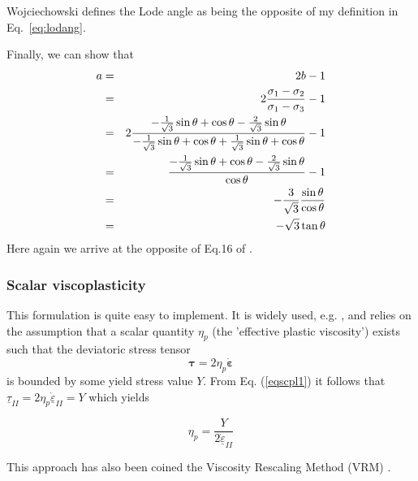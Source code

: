 \begin{remark}
Wojciechowski \cite{wojc18} defines the Lode angle  
as being the opposite of my definition in Eq.~\ref{eq:lodang}.
\end{remark}

Finally, we can show that 
\begin{eqnarray}
a 
&=& 2b-1 \nonumber\\
&=& 2 \frac{\sigma_1-\sigma_2}{\sigma_1-\sigma_3} -1 \nonumber\\
&=& 2 \frac{  -\frac{1}{\sqrt{3}}\sin \theta  + \cos \theta - \frac{2}{\sqrt{3}} \sin \theta }
{-\frac{1}{\sqrt{3}}\sin \theta  + \cos \theta +\frac{1}{\sqrt{3}}\sin \theta  + \cos \theta } -1 \nonumber\\
&=& \frac{ -\frac{1}{\sqrt{3}}\sin \theta  + \cos \theta - \frac{2}{\sqrt{3}}\sin\theta }{\cos \theta } -1 \nonumber\\
&=& -\frac{3}{\sqrt{3}} \frac{\sin\theta}{\cos\theta} \nonumber\\
&=& -\sqrt{3} \tan\theta
\end{eqnarray}
Here again we arrive at the opposite of Eq.16 of \cite{wojc18}. 

\subsubsection{Scalar viscoplasticity}

This formulation is quite easy to implement. It is widely used, e.g. \cite{will92,thfb08,spmw16}, and relies on the assumption that 
a scalar quantity $\eta_p$ (the 'effective plastic viscosity') exists such that the deviatoric stress tensor 
\begin{equation}
{\bm \tau}=2\eta_p \dot{\bm\varepsilon} \label{eqscpl1}
\end{equation}
is bounded by some yield stress value $Y$.
From Eq. (\ref{eqscpl1}) it follows that $\underline{\tau}_{II}= 2\eta_p \dot{\underline{\varepsilon}}_{II}=Y$ which yields
\begin{mdframed}[backgroundcolor=blue!5]
\[
\eta_p = \frac{Y}{2 \dot{\underline{\varepsilon}}_{II}}
\]
\end{mdframed}
This approach has also been coined the Viscosity Rescaling Method (VRM) \cite{kacha04}. 
 


